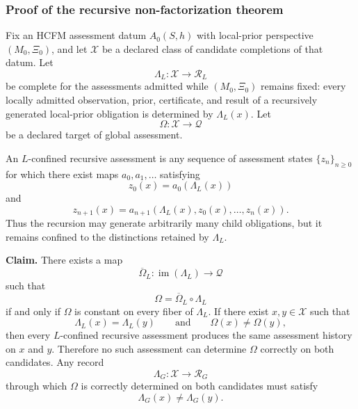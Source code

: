 \documentclass[11pt]{article}
\theoremstyle{definition}
\begin{document}
\subsubsection*{Proof of the recursive non-factorization theorem}

Fix an HCFM assessment datum $A_0(S,h)$ with local-prior perspective
$(M_0,\Xi_0)$, and let $\mathcal{X}$ be a declared class of candidate
completions of that datum. Let
\[
\Lambda_L : \mathcal{X} \longrightarrow \mathcal{R}_L
\]
be complete for the assessments admitted while $(M_0,\Xi_0)$ remains fixed:
every locally admitted observation, prior, certificate, and result of a
recursively generated local-prior obligation is determined by
$\Lambda_L(x)$. Let
\[
\Omega : \mathcal{X} \longrightarrow \mathcal{Q}
\]
be a declared target of global assessment.

An $L$-confined recursive assessment is any sequence of assessment states
$\{z_n\}_{n\geq 0}$ for which there exist maps $a_0,a_1,\ldots$ satisfying
\[
z_0(x)=a_0\!\left(\Lambda_L(x)\right)
\]
and
\[
z_{n+1}(x)
=
a_{n+1}\!\left(
\Lambda_L(x),
z_0(x),\ldots,z_n(x)
\right).
\]
Thus the recursion may generate arbitrarily many child obligations, but it
remains confined to the distinctions retained by $\Lambda_L$.

\noindent\textbf{Claim.}
There exists a map
\[
\overline{\Omega}_L :
\operatorname{im}(\Lambda_L) \longrightarrow \mathcal{Q}
\]
such that
\[
\Omega=\overline{\Omega}_L\circ\Lambda_L
\]
if and only if $\Omega$ is constant on every fiber of $\Lambda_L$.
If there exist $x,y\in\mathcal{X}$ such that
\[
\Lambda_L(x)=\Lambda_L(y)
\qquad\text{and}\qquad
\Omega(x)\neq\Omega(y),
\]
then every $L$-confined recursive assessment produces the same assessment
history on $x$ and $y$. Therefore no such assessment can determine
$\Omega$ correctly on both candidates. Any record
\[
\Lambda_G : \mathcal{X} \longrightarrow \mathcal{R}_G
\]
through which $\Omega$ is correctly determined on both candidates must
satisfy
\[
\Lambda_G(x)\neq\Lambda_G(y).
\]
\end{document}
